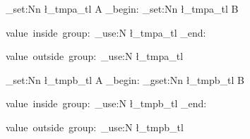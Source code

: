 \ExplSyntaxOn
\tl_set:Nn \l_tmpa_tl {A}
\group_begin:
\tl_set:Nn \l_tmpa_tl {B}
\par value~inside~group:~\tl_use:N \l_tmpa_tl
\group_end:
\par value~outside~group:~\tl_use:N \l_tmpa_tl

\tl_set:Nn \l_tmpb_tl {A}
\group_begin:
\tl_gset:Nn \l_tmpb_tl {B}
\par value~inside~group:~\tl_use:N \l_tmpb_tl
\group_end:
\par value~outside~group:~\tl_use:N \l_tmpb_tl
\ExplSyntaxOff
